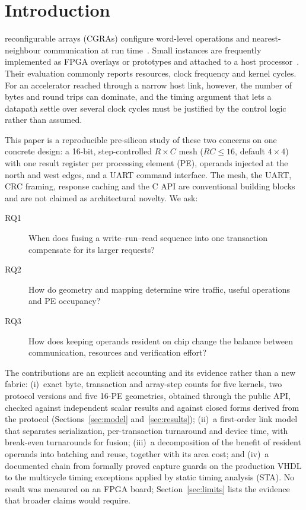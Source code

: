 \section{Introduction}
\label{sec:intro}

 reconfigurable arrays (CGRAs) configure
word-level operations and nearest-neighbour communication at run
time~\cite{hartenstein,cgra-survey,podobas-survey}. Small instances are
frequently implemented as FPGA overlays or prototypes and attached to a host
processor~\cite{cgra-me-ispd,quickdough}. Their evaluation commonly reports
resources, clock frequency and kernel cycles. For an accelerator reached
through a narrow host link, however, the number of bytes and round trips can
dominate, and the timing argument that lets a datapath settle over several
clock cycles must be justified by the control logic rather than assumed.

This paper is a reproducible pre-silicon study of these two concerns on one
concrete design: a 16-bit, step-controlled $R\times C$ mesh ($RC\le16$,
default $4\times4$) with one result register per processing element (PE),
operands injected at the north and west edges, and a UART command
interface. The mesh, the UART, CRC framing, response caching and the C API
are conventional building blocks and are not claimed as architectural
novelty. We ask:
\begin{description}
  \item[RQ1] When does fusing a write--run--read sequence into one
        transaction compensate for its larger requests?
  \item[RQ2] How do geometry and mapping determine wire traffic, useful
        operations and PE occupancy?
  \item[RQ3] How does keeping operands resident on chip change the balance
        between communication, resources and verification effort?
\end{description}

The contributions are an explicit accounting and its evidence rather than a
new fabric: (i)~exact byte, transaction and array-step counts for five
kernels, two protocol versions and five 16-PE geometries, obtained through
the public API, checked against independent scalar results and against
closed forms derived from the protocol (Sections~\ref{sec:model}
and~\ref{sec:results}); (ii)~a first-order link model that separates
serialization, per-transaction turnaround and device time, with break-even
turnarounds for fusion; (iii)~a decomposition of the benefit of resident
operands into batching and reuse, together with its area cost; and (iv)~a
documented chain from formally proved capture guards on the production VHDL
to the multicycle timing exceptions applied by static timing analysis
(STA). No result was measured on an FPGA board; Section~\ref{sec:limits}
lists the evidence that broader claims would require.
